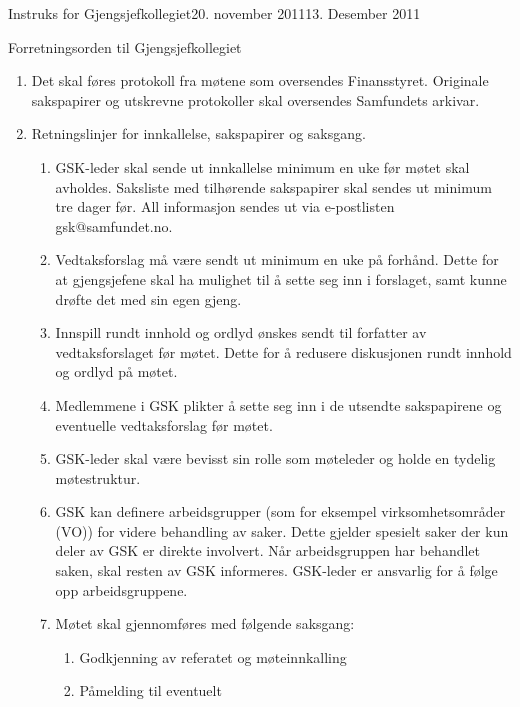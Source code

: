\documentclass[../fsbok.tex]{subfiles}
\begin{document}
\begin{instruks}{Instruks for Gjengsjefkollegiet}{20. november 2011}{13. Desember 2011}
\begin{instruksledd}{Forretningsorden til Gjengsjefkollegiet}
\begin{enumerate}
            \item Det skal føres protokoll fra møtene som oversendes Finansstyret. Originale
                sakspapirer og utskrevne
                protokoller skal oversendes Samfundets arkivar.
            \item Retningslinjer for innkallelse, sakspapirer og saksgang.
                \begin{enumerate}
                    \item GSK-leder skal sende ut innkallelse minimum en uke før møtet skal
                        avholdes. Saksliste med tilhørende
                        sakspapirer skal sendes ut minimum tre dager før. All informasjon sendes
                        ut via e-postlisten gsk@samfundet.no.
                    \item Vedtaksforslag må være sendt ut minimum en uke på forhånd. Dette for at
                        gjengsjefene skal ha mulighet
                        til å sette seg inn i forslaget, samt kunne drøfte det med sin egen gjeng.
                    \item Innspill rundt innhold og ordlyd
                        ønskes sendt til forfatter av vedtaksforslaget før møtet. Dette for å
                        redusere diskusjonen rundt innhold og
                        ordlyd på møtet.
                    \item Medlemmene i GSK plikter å sette seg inn i de utsendte sakspapirene og
                        eventuelle vedtaksforslag før
                        møtet.
                    \item GSK-leder skal være bevisst sin rolle som møteleder og holde en tydelig
                        møtestruktur.
                    \item GSK kan definere arbeidsgrupper (som for eksempel virksomhetsområder (VO))
                        for videre behandling
                        av saker. Dette gjelder spesielt saker der kun deler av GSK er direkte
                        involvert. Når arbeidsgruppen har
                        behandlet saken, skal resten av GSK informeres. GSK-leder er ansvarlig for
                        å følge opp
                        arbeidsgruppene.
                    \item Møtet skal gjennomføres med følgende saksgang:
                        \begin{enumerate}
                            \item Godkjenning av referatet og møteinnkalling
                            \item Påmelding til eventuelt

\end{enumerate}
\end{enumerate}
\end{enumerate}
\end{instruksledd}
\end{instruks}
\end{document}
